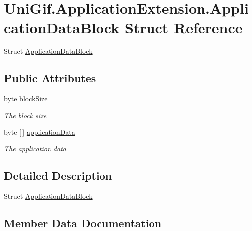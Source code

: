 \hypertarget{struct_uni_gif_1_1_application_extension_1_1_application_data_block}{}\section{Uni\+Gif.\+Application\+Extension.\+Application\+Data\+Block Struct Reference}
\label{struct_uni_gif_1_1_application_extension_1_1_application_data_block}


Struct \hyperlink{struct_uni_gif_1_1_application_extension_1_1_application_data_block}{Application\+Data\+Block}  


\subsection*{Public Attributes}
\begin{DoxyCompactItemize}
\item 
byte \hyperlink{struct_uni_gif_1_1_application_extension_1_1_application_data_block_ad821970f8342c9a6c8c59fa213cac604}{block\+Size}
\begin{DoxyCompactList}\small\item\em The block size \end{DoxyCompactList}\item 
byte \mbox{[}$\,$\mbox{]} \hyperlink{struct_uni_gif_1_1_application_extension_1_1_application_data_block_aca6b270b9b4bc93feb7da16d9048e463}{application\+Data}
\begin{DoxyCompactList}\small\item\em The application data \end{DoxyCompactList}\end{DoxyCompactItemize}


\subsection{Detailed Description}
Struct \hyperlink{struct_uni_gif_1_1_application_extension_1_1_application_data_block}{Application\+Data\+Block} 



\subsection{Member Data Documentation}
\mbox{\label{struct_uni_gif_1_1_application_extension_1_1_application_data_block_aca6b270b9b4bc93feb7da16d9048e463}} 
